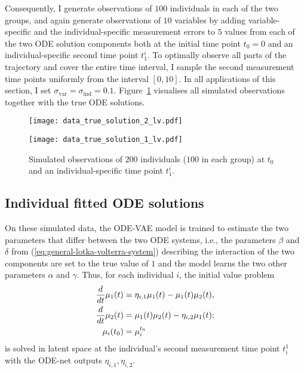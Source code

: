 Consequently, I generate observations of $100$ individuals in each of the two groups, and again generate observations of $10$ variables by adding variable-specific and the individual-specific measurement errors to $5$ values from each of the two ODE solution components both at the initial time point $t_0 = 0$ and an individual-specific second time point $t_1^i$. 
To optimally observe all parts of the trajectory and cover the entire time interval, I sample the second measurement time points uniformly from the interval $[0,10]$.
In all applications of this section, I set $\sigma_{\mathrm{var}} = \sigma_{\mathrm{ind}} = 0.1$. Figure~\ref{fig:data_truesolution_lv} visualises all simulated observations together with the true ODE solutions.
\begin{figure}
	\centering
	\begin{minipage}{.5\linewidth}
		\centering
		\texttt{[image: data\_true\_solution\_2\_lv.pdf]}
	\end{minipage}\begin{minipage}{.5\linewidth}
		\centering
		\texttt{[image: data\_true\_solution\_1\_lv.pdf]}
	\end{minipage}
	\caption{Simulated observations of $200$ individuals ($100$ in each group) at $t_0$ and an individual-specific time point $t_1^i$.}
	\label{fig:data_truesolution_lv}
\end{figure}

\subsection{Individual fitted ODE solutions}\label{sec:apps-nonlinear2p-individualresults}

On these simulated data, the ODE-VAE model is trained to estimate the two parameters that differ between the two ODE systems, i.e., the parameters $\beta$ and $\delta$ from (\ref{eq:general-lotka-volterra-system}) describing the interaction of the two components are set to the true value of $1$ and the model learns the two other parameters $\alpha$ and $\gamma$. Thus, for each individual $i$, the initial value problem 
	\begin{equation*}
		\begin{split}
			\frac{d}{dt}\mu_1(t) &= \eta_{i,1} \mu_1(t) - \mu_1(t) \mu_2(t), \\
			\frac{d}{dt}\mu_2(t) &= \mu_1(t) \mu_2(t) - \eta_{i,2} \mu_1(t); \\
			\mu_{i}(t_0) &= \mu_{i}^{t_0} 
\end{split}
\end{equation*}
is solved in latent space at the individual's second measurement time point $t_i^1$ with the ODE-net outputs $\eta_{i,1}, \eta_{i,2}$. 

